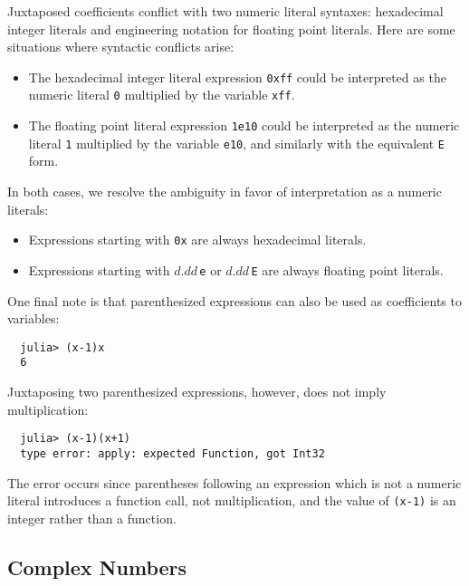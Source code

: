 \documentclass{article}
\begin{document}
Juxtaposed coefficients conflict with two numeric literal syntaxes:
hexadecimal integer literals and engineering notation for floating point literals.
Here are some situations where syntactic conflicts arise:
\begin{itemize}
\item The hexadecimal integer literal expression \verb|0xff| could be interpreted as the numeric literal \verb|0| multiplied by the variable \verb|xff|.
\item The floating point literal expression \verb|1e10| could be interpreted as the numeric literal \verb|1| multiplied by the variable \verb|e10|, and similarly with the equivalent \verb|E| form.
\end{itemize}
In both cases, we resolve the ambiguity in favor of interpretation as a numeric literals:
\begin{itemize}
\item Expressions starting with \verb|0x| are always hexadecimal literals.
\item Expressions starting with $d.dd$\,\verb|e| or $d.dd$\,\verb|E| are always floating point literals.
\end{itemize}
One final note is that parenthesized expressions can also be used as coefficients to variables:
\begin{verbatim}
  julia> (x-1)x
  6
\end{verbatim}
Juxtaposing two parenthesized expressions, however, does not imply multiplication:
\begin{verbatim}
  julia> (x-1)(x+1)
  type error: apply: expected Function, got Int32
\end{verbatim}
The error occurs since parentheses following an expression which is not a numeric literal introduces a function call, not multiplication, and the value of \verb|(x-1)| is an integer rather than a function.

\subsection{Complex Numbers}
\end{document}
